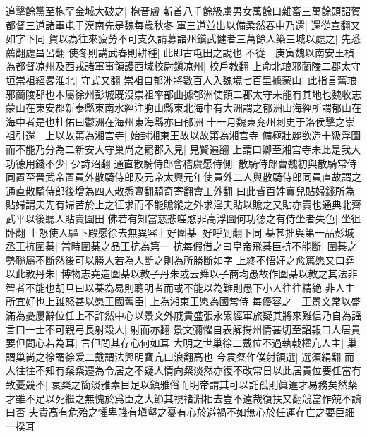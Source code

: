 追擊餘黨至枹罕金城大破之|{
	抱音膚}
斬首八千餘級虜男女萬餘口雜畜三萬餘頭詔賀都督三道諸軍屯于漠南先是魏每歲秋冬軍三道並出以備柔然春中乃還|{
	還從宣翻又如字下同}
賀以為往來疲勞不可支久請募諸州鎭武健者三萬餘人築三城以處之|{
	先悉薦翻處昌呂翻}
使冬則講武春則耕種|{
	此即古屯田之說也}
不從　庚寅魏以南安王楨為都督凉州及西戎諸軍事領護西域校尉鎭凉州|{
	校戶教翻}
上命北琅邪蘭陵二郡太守垣崇祖經畧淮北|{
	守式又翻}
崇祖自郁洲將數百人入魏境七百里據蒙山|{
	此指言舊琅邪蘭陵郡也本屬徐州彭城既沒崇祖率部曲據郁洲使領二郡太守未能有其地也魏收志蒙山在東安郡新泰縣東南水經注朐山縣東北海中有大洲謂之郁洲山海經所謂郁山在海中者是也杜佑曰鬱洲在海州東海縣亦曰郁洲}
十一月魏東兖州刺史于洛侯擊之崇祖引還　上以故第為湘宫寺|{
	始封湘東王故以故第為湘宫寺}
備極壯麗欲造十級浮圖而不能乃分為二新安大守巢尚之罷郡入見|{
	見賢遍翻}
上謂曰卿至湘宫寺未此是我大功德用錢不少|{
	少詩沼翻}
通直散騎侍郎會稽虞愿侍側|{
	散騎侍郎曹魏初與散騎常侍同置至晉武帝置員外散騎侍郎及元帝太興元年使員外二人與散騎侍郎同員直故謂之通直散騎侍郎後增為四人散悉亶翻騎奇寄翻會工外翻}
曰此皆百姓賣兒貼婦錢所為|{
	貼婦謂夫先有婦苦於上之征求而不能贍縱之外求淫夫貼以贍之又貼亦賣也通典北齊武平以後聽人貼賣園田}
佛若有知當慈悲嗟愍罪高浮圖何功德之有侍坐者失色|{
	坐徂卧翻}
上怒使人驅下殿愿徐去無異容上好圍棊|{
	好呼到翻下同}
棊甚拙與第一品彭城丞王抗圍棊|{
	當時圍棊之品王抗為第一}
抗每假借之曰皇帝飛棊臣抗不能斷|{
	圍棊之勢聯屬不斷然後可以勝人若為人斷之則為所勝斷如字}
上終不悟好之愈篤愿又曰堯以此教丹朱|{
	博物志堯造圍棊以教子丹朱或云舜以子商均愚故作圍棊以教之其法非智者不能也胡旦曰以棊為易則聰明者而或不能以為難則愚下小人往往精絶}
非人主所宜好也上雖怒甚以愿王國舊臣|{
	上為湘東王愿為國常侍}
每優容之　王景文常以盛滿為憂屢辭位任上不許然中心以景文外戚貴盛張永累經軍旅疑其將來難信乃自為謡言曰一士不可親弓長射殺人|{
	射而亦翻}
景文彌懼自表解揚州情甚切至詔報曰人居貴要但問心若為耳|{
	言但問其存心何如耳}
大明之世巢徐二戴位不過執戟權亢人主|{
	巢謂巢尚之徐謂徐爰二戴謂法興明寶亢口浪翻高也}
今袁粲作僕射領選|{
	選須絹翻}
而人往往不知有粲粲遷為令居之不疑人情向粲淡然亦復不改常日以此居貴位要任當有致憂競不|{
	袁粲之簡淡雅素目足以鎮雅俗而明帝謂其可以託孤則眞違才易務矣然粲才雖不足以死繼之無愧於爲臣之大節其視禇淵相去豈不遠哉復扶又翻競當作兢不讀曰否}
夫貴高有危殆之懼卑賤有塡壑之憂有心於避禍不如無心於任運存亡之要巨細一揆耳

